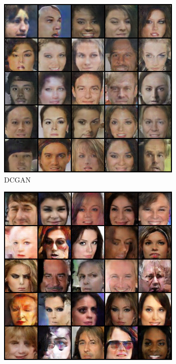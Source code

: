 \documentclass[12pt, a4paper]{article}
\begin{document}
\begin{figure}
	\centering
	\begin{subfigure}[b]{0.475\textwidth}
		\centering
		\includegraphics[width=\textwidth]{DCGAN.png}
		\caption[Network2]%
		{{\small DCGAN}}    
		\label{fig:mean and std of net14}
	\end{subfigure}
	\hfill
	\begin{subfigure}[b]{0.475\textwidth}  
		\centering 
		\includegraphics[width=\textwidth]{SN(1)-DCGAN.png}

\end{subfigure}
\end{figure}
\end{document}
